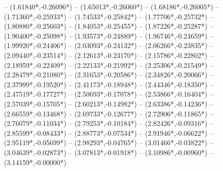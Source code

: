 {	-- ({1.61840*\dx},{-0.26096*\dy})
	-- ({1.65013*\dx},{-0.26060*\dy})
	-- ({1.68186*\dx},{-0.26005*\dy})
	-- ({1.71360*\dx},{-0.25933*\dy})
	-- ({1.74533*\dx},{-0.25842*\dy})
	-- ({1.77706*\dx},{-0.25732*\dy})
	-- ({1.80880*\dx},{-0.25603*\dy})
	-- ({1.84053*\dx},{-0.25455*\dy})
	-- ({1.87226*\dx},{-0.25287*\dy})
	-- ({1.90400*\dx},{-0.25098*\dy})
	-- ({1.93573*\dx},{-0.24889*\dy})
	-- ({1.96746*\dx},{-0.24659*\dy})
	-- ({1.99920*\dx},{-0.24406*\dy})
	-- ({2.03093*\dx},{-0.24132*\dy})
	-- ({2.06266*\dx},{-0.23835*\dy})
	-- ({2.09440*\dx},{-0.23514*\dy})
	-- ({2.12613*\dx},{-0.23170*\dy})
	-- ({2.15786*\dx},{-0.22802*\dy})
	-- ({2.18959*\dx},{-0.22409*\dy})
	-- ({2.22133*\dx},{-0.21992*\dy})
	-- ({2.25306*\dx},{-0.21549*\dy})
	-- ({2.28479*\dx},{-0.21080*\dy})
	-- ({2.31653*\dx},{-0.20586*\dy})
	-- ({2.34826*\dx},{-0.20066*\dy})
	-- ({2.37999*\dx},{-0.19520*\dy})
	-- ({2.41173*\dx},{-0.18948*\dy})
	-- ({2.44346*\dx},{-0.18350*\dy})
	-- ({2.47519*\dx},{-0.17727*\dy})
	-- ({2.50693*\dx},{-0.17078*\dy})
	-- ({2.53866*\dx},{-0.16404*\dy})
	-- ({2.57039*\dx},{-0.15705*\dy})
	-- ({2.60213*\dx},{-0.14982*\dy})
	-- ({2.63386*\dx},{-0.14236*\dy})
	-- ({2.66559*\dx},{-0.13468*\dy})
	-- ({2.69733*\dx},{-0.12677*\dy})
	-- ({2.72906*\dx},{-0.11865*\dy})
	-- ({2.76079*\dx},{-0.11034*\dy})
	-- ({2.79253*\dx},{-0.10184*\dy})
	-- ({2.82426*\dx},{-0.09316*\dy})
	-- ({2.85599*\dx},{-0.08433*\dy})
	-- ({2.88773*\dx},{-0.07534*\dy})
	-- ({2.91946*\dx},{-0.06622*\dy})
	-- ({2.95119*\dx},{-0.05699*\dy})
	-- ({2.98293*\dx},{-0.04765*\dy})
	-- ({3.01466*\dx},{-0.03822*\dy})
	-- ({3.04639*\dx},{-0.02873*\dy})
	-- ({3.07813*\dx},{-0.01918*\dy})
	-- ({3.10986*\dx},{-0.00960*\dy})
	-- ({3.14159*\dx},{-0.00000*\dy})
}
